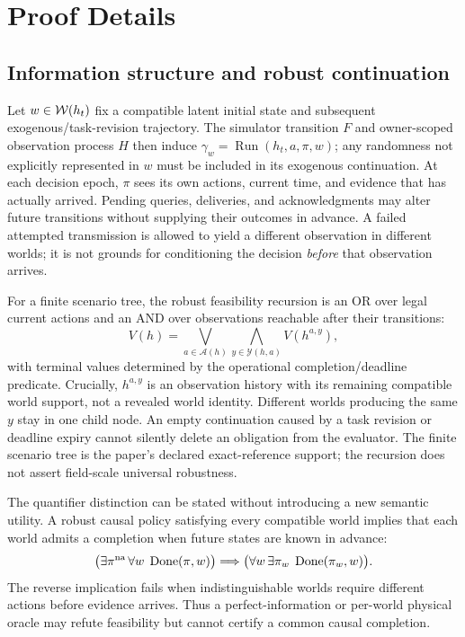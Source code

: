 \appendices

\section{Proof Details}
\label{app:proofs}

\subsection{Information structure and robust continuation}
Let $w\in\mathcal{W}(h_t)$ fix a compatible latent initial state and subsequent exogenous/task-revision trajectory. The simulator transition $F$ and owner-scoped observation process $H$ then induce $\gamma_w=\operatorname{Run}(h_t,a,\pi,w)$; any randomness not explicitly represented in $w$ must be included in its exogenous continuation. At each decision epoch, $\pi$ sees its own actions, current time, and evidence that has actually arrived. Pending queries, deliveries, and acknowledgments may alter future transitions without supplying their outcomes in advance. A failed attempted transmission is allowed to yield a different observation in different worlds; it is not grounds for conditioning the decision \emph{before} that observation arrives.

For a finite scenario tree, the robust feasibility recursion is an OR over legal current actions and an AND over observations reachable after their transitions:
\begin{equation}
V(h)=\bigvee_{a\in\mathcal A(h)}
\bigwedge_{y\in\mathcal Y(h,a)}V(h^{a,y}),
\end{equation}
with terminal values determined by the operational completion/deadline predicate. Crucially, $h^{a,y}$ is an observation history with its remaining compatible world support, not a revealed world identity. Different worlds producing the same $y$ stay in one child node. An empty continuation caused by a task revision or deadline expiry cannot silently delete an obligation from the evaluator. The finite scenario tree is the paper's declared exact-reference support; the recursion does not assert field-scale universal robustness.

The quantifier distinction can be stated without introducing a new semantic utility. A robust causal policy satisfying every compatible world implies that each world admits a completion when future states are known in advance:
\begin{equation}
\bigl(\exists\pi^{\rm na}\,\forall w\;\operatorname{Done}(\pi,w)\bigr)
\Longrightarrow
\bigl(\forall w\,\exists\pi_w\;\operatorname{Done}(\pi_w,w)\bigr).
\end{equation}
The reverse implication fails when indistinguishable worlds require different actions before evidence arrives. Thus a perfect-information or per-world physical oracle may refute feasibility but cannot certify a common causal completion.


